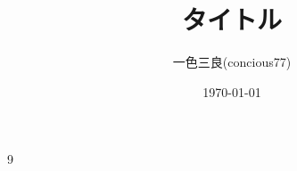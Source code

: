 \documentclass[leqno]{jsarticle}
\title{タイトル}
\author{一色三良(concious77)}
\date{\today}
\begin{document}
\maketitle

























































	
\begin{thebibliography}{9}
\end{thebibliography}




			
\end{document}
